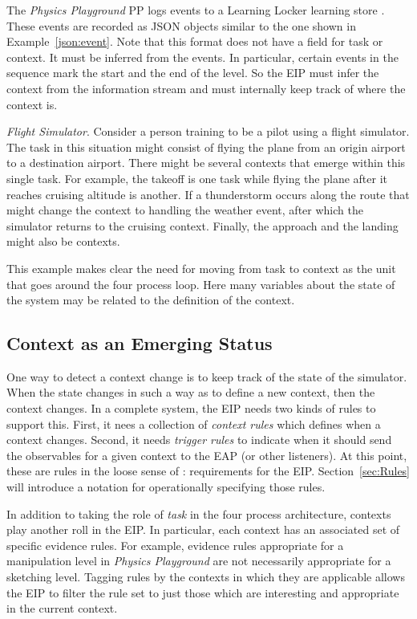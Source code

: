 \documentclass{article}
\begin{document}
  The \textit{Physics Playground} PP logs events to a Learning Locker
  learning store \cite{LearningLocker}.  These events are recorded as
  JSON objects similar to the one shown in Example~\ref{json:event}.
  Note that this format does not have a field for task or context.  It
  must be inferred from the events.  In particular, certain events in
  the sequence mark the start and the end of the level.  So the EIP
  must infer the context from the information stream and must
  internally keep track of where the context is.

  \noindent\textit{Flight Simulator}.  Consider a person training to
  be a pilot using a flight simulator.  The task in this situation
  might consist of flying the plane from an origin airport to a
  destination airport.  There might be several contexts that emerge
  within this single task.  For example, the takeoff is one task while
  flying the plane after it reaches cruising altitude is another.  If
  a thunderstorm occurs along the route that might change the context
  to handling the weather event, after which the simulator returns to
  the cruising context.  Finally, the approach and the landing might
  also be contexts.

  This example makes clear the need for moving from task to context as
  the unit that goes around the four process loop.  Here many
  variables about the state of the system may be related to the
  definition of the context.

  \subsection{Context as an Emerging Status}

  One way to detect a context change is to keep track of the state of
  the simulator.  When the state changes in such a way as to define a
  new context, then the context changes.  In a complete system, the
  EIP needs two kinds of rules to support this.  First, it nees a
  collection of \textit{context rules} which defines when a context
  changes.  Second, it needs \textit{trigger rules} to indicate when
  it should send the observables for a given context to the EAP (or
  other listeners).  At this point, these are rules in the loose sense
  of :  requirements for the EIP.
  Section~\ref{sec:Rules} will introduce a notation for operationally
  specifying those rules.

  In addition to taking the role of \textit{task} in the four process
  architecture, contexts play another roll in the EIP.  In particular,
  each context has an associated set of specific evidence rules.  For
  example, evidence rules appropriate for a manipulation level in
  \textit{Physics Playground} are not necessarily appropriate for a
  sketching level.  Tagging rules by the contexts in which they are
  applicable allows the EIP to filter the rule set to just those which
  are interesting and appropriate in the current context.
\end{document}
